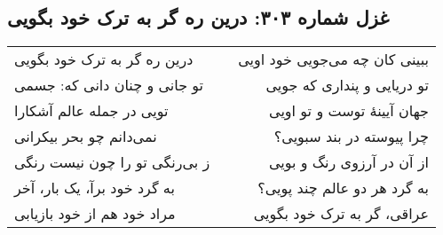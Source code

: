 \begin{center}
\section*{غزل شماره ۳۰۳: درین ره گر به ترک خود بگویی}
\label{sec:303}
\begin{longtable}{l p{0.5cm} r}
درین ره گر به ترک خود بگویی
&&
ببینی کان چه می‌جویی خود اویی
\\
تو جانی و چنان دانی که: جسمی
&&
تو دریایی و پنداری که جویی
\\
تویی در جمله عالم آشکارا
&&
جهان آیینهٔ توست و تو اویی
\\
نمی‌دانم چو بحر بیکرانی
&&
چرا پیوسته در بند سبویی؟
\\
ز بی‌رنگی تو را چون نیست رنگی
&&
از آن در آرزوی رنگ و بویی
\\
به گرد خود برآ، یک بار، آخر
&&
به گرد هر دو عالم چند پویی؟
\\
مراد خود هم از خود بازیابی
&&
عراقی، گر به ترک خود بگویی
\\
\end{longtable}
\end{center}
